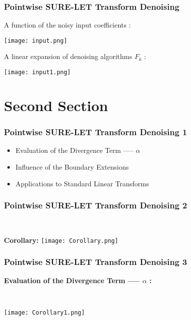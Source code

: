 \documentclass{beamer}
\begin{document}
	
	
	
	
	\begin{frame}
		\frametitle{ Pointwise SURE-LET Transform Denoising}
		A function of the noisy
		input coefficients :
		\begin{center}
			\texttt{[image: input.png]}
		\end{center}
		
		A linear
		expansion of denoising algorithms $F_k$ :
		\begin{center}
			\texttt{[image: input1.png]}
		\end{center}
		
	\end{frame}
	
	\section{Second Section}
	
	\begin{frame}
		\frametitle{Pointwise SURE-LET Transform Denoising 1}
\begin{itemize}
	\item Evaluation of the Divergence Term ----- $\alpha$ 
	\item Influence of the Boundary Extensions
	\item Applications to Standard Linear Transforms
\end{itemize}

\end{frame}
	
	
	\begin{frame}
		\frametitle{Pointwise SURE-LET Transform Denoising 2}

	
	\
	\begin{block}{\textbf{Corollary:}}
			\texttt{[image: Corollary.png]}
	\end{block}
	
	

	
	\end{frame}
	
	
	\begin{frame}
\frametitle{Pointwise SURE-LET Transform Denoising 3}
	\textbf{Evaluation of the Divergence Term ----- $\alpha$ :}
	
	\
	
	
	\texttt{[image: Corollary1.png]}
	
	\end{frame}
	
\end{document}
